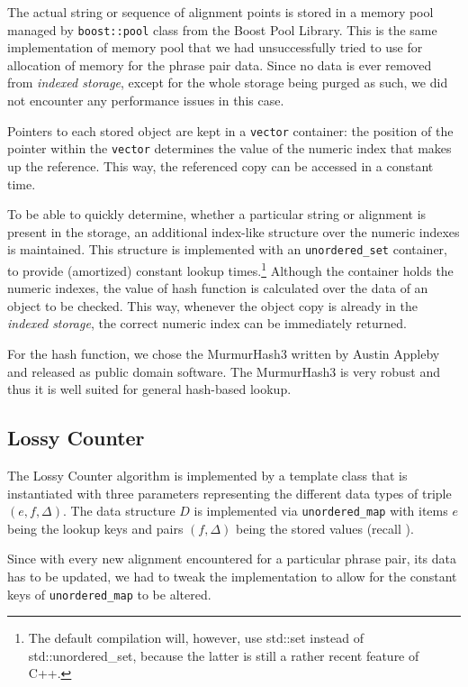 The actual string or sequence of alignment points is stored in a memory pool managed by
\texttt{boost::pool} class from the Boost Pool Library.
This is the same implementation of memory pool that we had unsuccessfully tried to use
for allocation of memory for the phrase pair data.
Since no data is ever removed from \emph{indexed storage}, except for the whole storage
being purged as such, we did not encounter any performance issues in this case.

Pointers to each stored object are kept in a \texttt{vector} container: the position of
the pointer within the \texttt{vector} determines the value of the numeric index that
makes up the reference. This way, the referenced copy can be accessed in a constant time.

To be able to quickly determine, whether a particular string or alignment is present
in the storage, an additional index-like structure over the numeric indexes is maintained.
This structure is implemented with an \texttt{unordered_set} container, to provide
(amortized) constant lookup times.\footnote{The default \eppex{} compilation will, however,
use std::set instead of std::unordered_set, because the latter is still a rather recent
feature of C++.}
Although the container holds the numeric indexes, the value of hash function is calculated
over the data of an object to be checked. This way, whenever the object copy is already in
the \emph{indexed storage}, the correct numeric index can be immediately returned.

For the hash function, we chose the MurmurHash3 written by Austin Appleby and released as
public domain software.
The MurmurHash3 is very robust and thus it is well suited for general hash-based lookup.

\subsection{Lossy Counter}

The Lossy Counter algorithm is implemented by a template class that is instantiated with
three parameters representing the different data types of triple $(e, f, \Delta)$.
The data structure $D$ is implemented via \texttt{unordered_map} with items $e$ being
the lookup keys and pairs $(f, \Delta)$ being the stored values (recall ).

Since with every new alignment encountered for a particular phrase pair, its data has to
be updated, we had to tweak the implementation to allow for the constant keys of
\texttt{unordered_map} to be altered.

